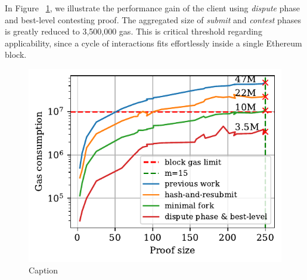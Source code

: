 

In Figure ~\ref{fig:dispute-best-level}, we illustrate the performance gain of
the client using \emph{dispute} phase and best-level contesting proof. The
aggregated size of \emph{submit} and \emph{contest} phases is greatly reduced
to 3,500,000 gas. This is critical threshold regarding applicability, since
a cycle of interactions fits effortlessly inside a single Ethereum block.



\begin{figure}[!h]
    \begin{center}
        \includegraphics[width=1\columnwidth]{figures/dispute-best-level.pdf}
    \end{center}
    \caption{Caption}
    \label{fig:dispute-best-level}
\end{figure}
